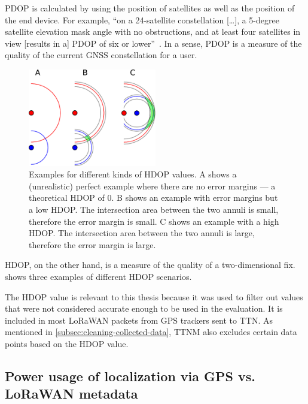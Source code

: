 \ac{PDOP} is calculated by using the position of satellites as well as the position of the end device.
For example, ``on a 24-satellite constellation […], a 5-degree satellite elevation mask angle with no obstructions, and at least four satellites in view [results in a] \acf{PDOP} of six or lower''~\cite{langley_dilution_1999}.
In a sense, \ac{PDOP} is a measure of the quality of the current \ac{GNSS} constellation for a user.

\begin{figure}[htbp]
    \centering
    \includegraphics[width=0.5\textwidth]{pictures/multilateration/Geometric_Dilution_Of_Precision.eps}
    \caption{
        Examples for different kinds of \ac{HDOP} values.
        A shows a (unrealistic) perfect example where there are no error margins --- a theoretical \ac{HDOP} of 0.
        B shows an example with error margins but a low \ac{HDOP}.
        The intersection area between the two annuli is small, therefore the error margin is small.
        C shows an example with a high \ac{HDOP}.
        The intersection area between the two annuli is large, therefore the error margin is large.\cite{xoneca_english_2013}
    }\label{pic:hdop-example-diagram}
\end{figure}

\ac{HDOP}, on the other hand, is a measure of the quality of a two-dimensional fix.
 shows three examples of different \ac{HDOP} scenarios.

The \ac{HDOP} value is relevant to this thesis because it was used to filter out values that were not considered accurate enough to be used in the evaluation.
It is included in most \ac{LoRaWAN} packets from \ac{GPS} trackers sent to \ac{TTN}.
As mentioned in \cref{subsec:cleaning-collected-data}, \ac{TTNM} also excludes certain data points based on the \ac{HDOP} value.

\subsection{Power usage of localization via \acl{GPS} vs. \acs{LoRaWAN} metadata}\label{subsec:gnss-power-usage}

